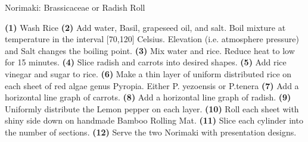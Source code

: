 \documentclass{recipecard}
\begin{document}
\vspace{8pt}


\begin{recipe}{Norimaki: Brassicaceae or Radish Roll}{}

 \textbf{(1)} Wash Rice 
 \textbf{(2)} Add water, Basil, grapeseed oil, and salt. Boil mixture at temperature in the interval [70,120] Celsius. Elevation (i.e. atmosphere pressure) and Salt changes the boiling point. 
 \textbf{(3)} Mix water and rice. Reduce heat to low for 15 minutes. 
 \textbf{(4)} Slice radish and carrots into desired shapes. 
 \textbf{(5)} Add rice vinegar and sugar to rice. 
 \textbf{(6)} Make a thin layer of uniform distributed rice on each sheet of red algae genus Pyropia. Either P. yezoensis or P.tenera 
 \textbf{(7)} Add a horizontal line graph of carrots. 
 \textbf{(8)} Add a horizontal line graph of radish. 
 \textbf{(9)} Uniformly distribute the Lemon pepper on each layer.
 \textbf{(10)} Roll each sheet with shiny side down on handmade Bamboo Rolling Mat. 
 \textbf{(11)} Slice each cylinder into the number of sections.
 \textbf{(12)} Serve the two Norimaki with presentation designs.
\end{recipe}
\end{document}
